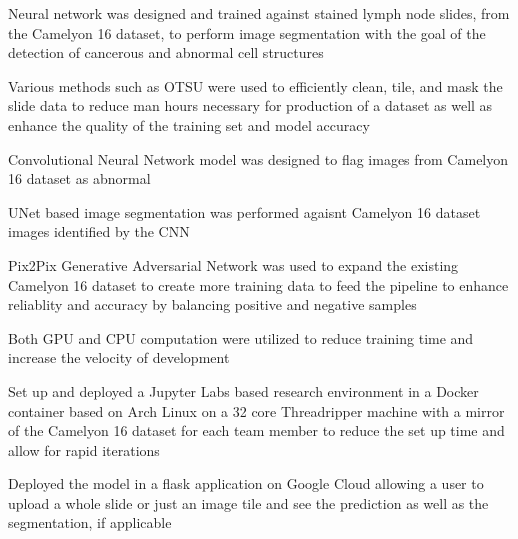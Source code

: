 \documentclass[letterpaper]{resume}
\begin{document}
\begin{compactitem}
\item Neural network was designed and trained against stained lymph node slides, from the Camelyon 16 dataset, to perform image segmentation with the goal of the detection of cancerous and abnormal cell structures
\item Various methods such as OTSU were used to efficiently clean, tile, and mask the slide data to reduce man hours necessary for production of a dataset as well as enhance the quality of the training set and model accuracy
\item Convolutional Neural Network model was designed to flag images from Camelyon 16 dataset as abnormal
\item UNet based image segmentation was performed agaisnt Camelyon 16 dataset images identified by the CNN
\item Pix2Pix Generative Adversarial Network was used to expand the existing Camelyon 16 dataset to create more training data to feed the pipeline to enhance reliablity and accuracy by balancing positive and negative samples
\item Both GPU and CPU computation were utilized to reduce training time and increase the velocity of development
\item Set up and deployed a Jupyter Labs based research environment in a Docker container based on Arch Linux on a 32 core Threadripper machine with a mirror of the Camelyon 16 dataset for each team member to reduce the set up time and allow for rapid iterations
\item Deployed the model in a flask application on Google Cloud allowing a user to upload a whole slide or just an image tile and see the prediction as well as the segmentation, if applicable
\end{compactitem}
\end{document}
